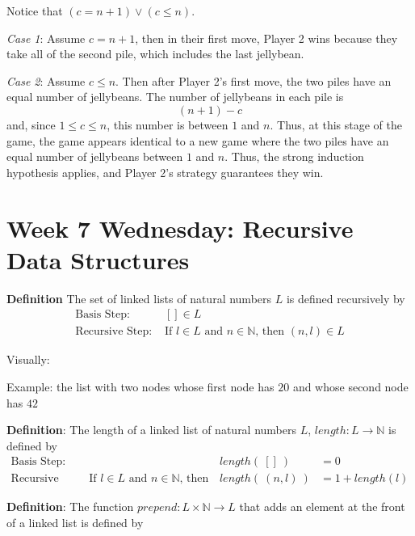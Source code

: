 \documentclass[12pt, oneside]{article}
\begin{document}
Notice that $(c = n+1) \lor (c \leq n)$.

{\it Case 1}: Assume $c = n+1$, then in their first move, 
Player 2 wins because they take all of the second pile, which 
includes the last jellybean.

{\it Case 2}: Assume $c \leq n$. Then after Player 2's first move,
the two piles have an equal number of jellybeans. The number
of jellybeans in each pile is 
\[
    (n+1) - c
\]
and, since $1 \leq c \leq n$, this number is between $1$ and $n$.
Thus, at this stage of the game, the game appears identical to a new 
game where the two piles have an equal number of jellybeans between $1$
and $n$. Thus, the strong induction hypothesis applies, and Player 2's
strategy guarantees they win.

 \newpage

\section*{Week 7 Wednesday: Recursive Data Structures}


{\bf Definition} The set of linked lists of natural numbers $L$ is defined recursively by
\[
\begin{array}{ll}
    \textrm{Basis Step: } & [] \in L \\
    \textrm{Recursive Step: } & \textrm{If } l \in L\textrm{ and }n \in \mathbb{N} \textrm{, then } (n, l) \in L
\end{array}
\] 

Visually:

\vspace{50pt}

Example: the list with two nodes whose first node has $20$ and whose second node
has $42$

\vspace{50pt} 

{\bf Definition}: The length of a linked list of natural numbers $L$, $length: L \to \mathbb{N}$ is defined by
\[
\begin{array}{llll}
\textrm{Basis Step:} &  & length(~[]~) &= 0 \\
\textrm{Recursive Step:} & \textrm{If } l \in L\textrm{ and }n \in \mathbb{N}\textrm{, then  } & length(~(n, l)~)  &= 1+ length(l)
\end{array}
\]
 \vspace{50pt}


{\bf Definition}: The function $prepend : L \times \mathbb{N} \to L$ that adds an element at the 
front of a linked list is defined by
\[
\phantom{prepend(~(l, n)~) = (n, l)}
\]
 \vspace{50pt}
\end{document}
